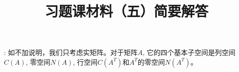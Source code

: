 \documentclass[UTF8]{ctexart}
\begin{document}
\title{习题课材料（五）简要解答}

\date{}

\maketitle

\vspace{-1cm}



\medskip

: 如不加说明，我们只考虑实矩阵。对于矩阵$A$, 它的四个基本子空间是列空间$C(A)$, 零空间$N(A)$, 行空间$C(A^T)$和$A^T$的零空间$N(A^T)$。

\medskip
\end{document}
